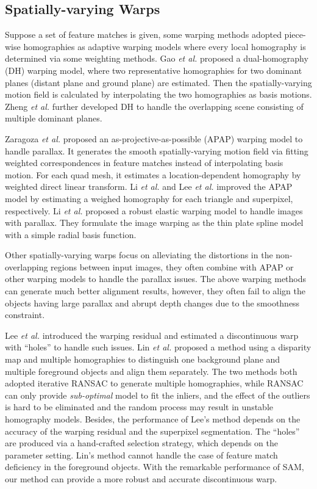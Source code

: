 \documentclass[10pt,twocolumn,letterpaper]{article}
\begin{document}
\subsection{Spatially-varying Warps}

Suppose a set of feature matches is given, some warping methods adopted piece-wise homographies as adaptive warping models where every local homography is determined via some weighting methods. Gao \emph{et al.} \cite{gao2011constructing} proposed
a dual-homography (DH) warping model, where two representative homographies for two dominant planes (distant plane and ground plane) are estimated. Then the spatially-varying motion field is calculated by interpolating the two homographies as basis motions. Zheng \emph{et al.} \cite{Zheng2019tmm} further developed DH to handle the overlapping scene consisting of multiple dominant planes.

Zaragoza \emph{et al.} \cite{zaragoza2014projective} proposed an as-projective-as-possible (APAP) warping model to handle parallax. It generates the smooth spatially-varying motion field via fitting weighted correspondences in feature matches instead of interpolating basis motion. For each quad mesh, it estimates a location-dependent homography by weighted direct linear transform. Li \emph{et al.} \cite{li2019local} and Lee \emph{et al.} \cite{Lee_2020_CVPR} improved the APAP model by estimating a weighed homography for each triangle and superpixel, respectively. Li \emph{et al.} \cite{li2018parallax} proposed a robust elastic warping model to handle images with parallax. They formulate the image warping as the thin plate spline model with a simple radial basis function.
%

Other spatially-varying warps \cite{chang2014shape,lin2015adaptive,li2017quasi,liu2019shape} focus on alleviating the distortions in the non-overlapping regions between input images, they often combine with APAP or other warping models to handle the parallax issues. The above warping methods can generate much better alignment results, however, they often fail to align the objects having large parallax and abrupt depth changes due to the smoothness constraint. 

Lee \emph{et al.} \cite{Lee_2020_CVPR} introduced the warping residual and estimated a discontinuous warp with ``holes'' to handle such issues. Lin \emph{et al.} \cite{lin2022image} proposed a method using a disparity map and multiple homographies to distinguish one background plane and multiple foreground objects and align them separately. The two methods both adopted iterative RANSAC to generate multiple homographies, while RANSAC can only provide \textit{sub-optimal} model to fit the inliers, and the effect of the outliers is hard to be eliminated and the random process may result in unstable homography models. Besides, the performance of Lee's method \cite{Lee_2020_CVPR} depends on the accuracy of the warping residual and the superpixel segmentation. The ``holes'' are produced via a hand-crafted selection strategy, which depends on the parameter setting. Lin's method \cite{lin2022image} cannot handle the case of feature match deficiency in the foreground objects. With the remarkable performance of SAM, our method can provide a more robust and accurate discontinuous warp.
\end{document}
